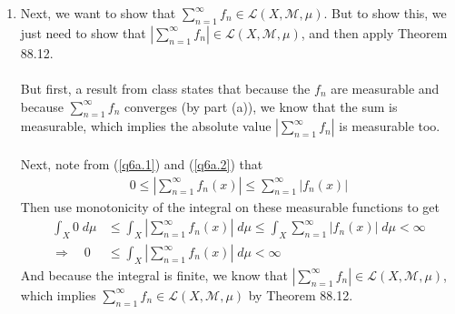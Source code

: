 \documentclass[12pt]{article}
\theoremstyle{plain}
\theoremstyle{definition}
\theoremstyle{remark}
\begin{document}
\begin{enumerate}
\begin{enumerate}
\item Next, we want to show that $\sum^\infty_{n=1} f_n\in \mathscr{L}(X,\mathscr{M},\mu)$. But to show this, we just need to show that $\left\lvert\sum^\infty_{n=1}f_n\right\rvert\in\mathscr{L}(X,\mathscr{M},\mu)$, and then apply Theorem 88.12.
\\
\\
But first, a result from class states that because the $f_n$ are measurable and because $\sum^\infty_{n=1} f_n$ converges (by part (a)), we know that the sum is measurable, which implies the absolute value $\left\lvert\sum^\infty_{n=1}f_n\right\rvert$ is measurable too. 
\\
\\
Next, note from (\ref{q6a.1}) and (\ref{q6a.2}) that 
\begin{align*}
    0\leq 
    \left\lvert \sum^\infty_{n=1} f_n(x)\right\rvert \leq
    \sum^\infty_{n=1} \left\lvert 
        f_n(x)\right\rvert 
\end{align*}
Then use monotonicity of the integral on these measurable functions to get
\begin{align*}
    \int_X 0\;d\mu &\leq 
    \int_X 
    \left\lvert \sum^\infty_{n=1} f_n(x)\right\rvert 
    \; d\mu
    \leq
    \int_X\sum^\infty_{n=1} \left\lvert 
        f_n(x)\right\rvert \;d\mu < \infty \\
    \Rightarrow \quad
    0 &\leq
    \int_X 
    \left\lvert \sum^\infty_{n=1} f_n(x)\right\rvert 
    \; d\mu <\infty
\end{align*}
And because the integral is finite, we know that $\left\lvert \sum^\infty_{n=1} f_n \right\rvert\in\mathscr{L}(X,\mathscr{M},\mu)$, which implies $\sum^\infty_{n=1} f_n \in\mathscr{L}(X,\mathscr{M},\mu)$ by Theorem 88.12.


\end{enumerate}
\end{enumerate}
\end{document}
